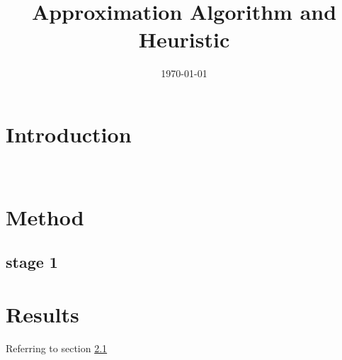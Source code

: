 \documentclass{article}
\title{\Huge Approximation Algorithm and Heuristic}
\author{}
\date{\today}
\begin{document}
\maketitle 

\newpage

\section{Introduction}
\
\newpage

\section{Method}

\subsection{stage 1}
\label{sec1}
\section{Results}
Referring to section \ref{sec1}
\end{document}
